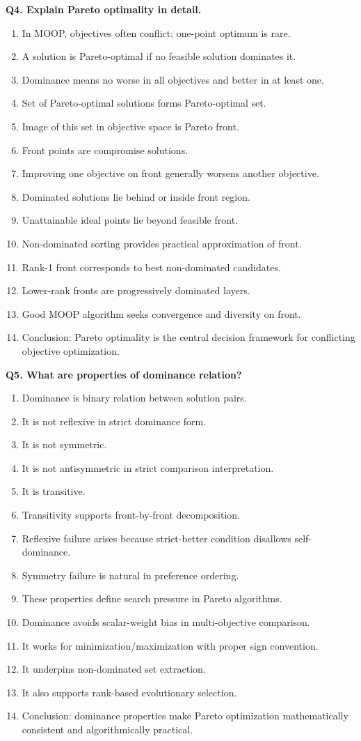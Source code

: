 \documentclass[11pt,a4paper]{article}
\begin{document}
\textbf{Q4. Explain Pareto optimality in detail.}
\begin{enumerate}
\item In MOOP, objectives often conflict; one-point optimum is rare.
\item A solution is Pareto-optimal if no feasible solution dominates it.
\item Dominance means no worse in all objectives and better in at least one.
\item Set of Pareto-optimal solutions forms Pareto-optimal set.
\item Image of this set in objective space is Pareto front.
\item Front points are compromise solutions.
\item Improving one objective on front generally worsens another objective.
\item Dominated solutions lie behind or inside front region.
\item Unattainable ideal points lie beyond feasible front.
\item Non-dominated sorting provides practical approximation of front.
\item Rank-1 front corresponds to best non-dominated candidates.
\item Lower-rank fronts are progressively dominated layers.
\item Good MOOP algorithm seeks convergence and diversity on front.
\item Conclusion: Pareto optimality is the central decision framework for conflicting objective optimization.
\end{enumerate}

\textbf{Q5. What are properties of dominance relation?}
\begin{enumerate}
\item Dominance is binary relation between solution pairs.
\item It is not reflexive in strict dominance form.
\item It is not symmetric.
\item It is not antisymmetric in strict comparison interpretation.
\item It is transitive.
\item Transitivity supports front-by-front decomposition.
\item Reflexive failure arises because strict-better condition disallows self-dominance.
\item Symmetry failure is natural in preference ordering.
\item These properties define search pressure in Pareto algorithms.
\item Dominance avoids scalar-weight bias in multi-objective comparison.
\item It works for minimization/maximization with proper sign convention.
\item It underpins non-dominated set extraction.
\item It also supports rank-based evolutionary selection.
\item Conclusion: dominance properties make Pareto optimization mathematically consistent and algorithmically practical.
\end{enumerate}
\end{document}
